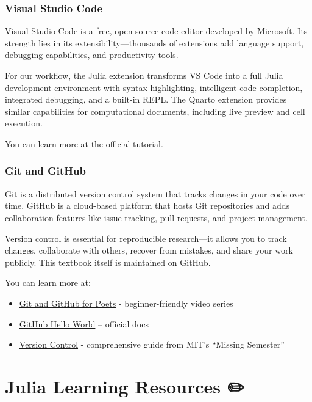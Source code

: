 \documentclass[
  letterpaper,
  DIV=11,
  numbers=noendperiod]{scrreprt}
\providecommand{\tightlist}{%
  \setlength{\itemsep}{0pt}\setlength{\parskip}{0pt}}
\begin{document}
\subsection{Visual Studio Code}\label{visual-studio-code}

Visual Studio Code is a free, open-source code editor developed by
Microsoft. Its strength lies in its extensibility---thousands of
extensions add language support, debugging capabilities, and
productivity tools.

For our workflow, the Julia extension transforms VS Code into a full
Julia development environment with syntax highlighting, intelligent code
completion, integrated debugging, and a built-in REPL. The Quarto
extension provides similar capabilities for computational documents,
including live preview and cell execution.

You can learn more at
\href{https://code.visualstudio.com/docs/introvideos/basics}{the
official tutorial}.

\subsection{Git and GitHub}\label{git-and-github}

Git is a distributed version control system that tracks changes in your
code over time. GitHub is a cloud-based platform that hosts Git
repositories and adds collaboration features like issue tracking, pull
requests, and project management.

Version control is essential for reproducible research---it allows you
to track changes, collaborate with others, recover from mistakes, and
share your work publicly. This textbook itself is maintained on GitHub.

You can learn more at:

\begin{itemize}
\tightlist
\item
  \href{https://www.youtube.com/playlist?list=PLRqwX-V7Uu6ZF9C0YMKuns9sLDzK6zoiV}{Git
  and GitHub for Poets} - beginner-friendly video series
\item
  \href{https://docs.github.com/en/get-started/start-your-journey/hello-world}{GitHub
  Hello World} -- official docs
\item
  \href{https://missing.csail.mit.edu/2020/version-control/}{Version
  Control} - comprehensive guide from MIT's ``Missing Semester''
\end{itemize}

\chapter{Julia Learning Resources ✏️}\label{julia-learning-resources}
\end{document}
